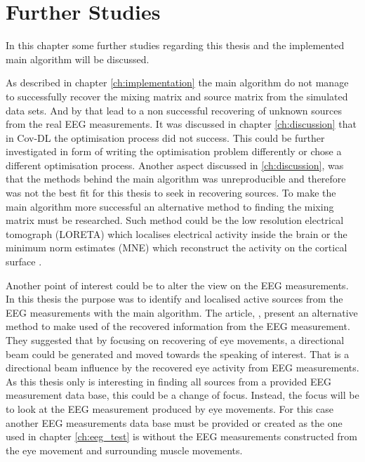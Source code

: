 \chapter{Further Studies}
In this chapter some further studies regarding this thesis and the implemented main algorithm will be discussed.

As described in chapter \ref{ch:implementation} the main algorithm do not manage to successfully recover the mixing matrix and source matrix from the simulated data sets. And by that lead to a non successful recovering of unknown sources from the real EEG measurements. 
It was discussed in chapter \ref{ch:discussion} that in Cov-DL the optimisation process did not success.
This could be further investigated in form of writing the optimisation problem differently or chose a different optimisation process. 
Another aspect discussed in \ref{ch:discussion}, was that the methods behind the main algorithm was unreproducible and therefore was not the best fit for this thesis to seek in recovering sources. 
To make the main algorithm more successful an alternative method to finding the mixing matrix must be researched. Such method could be the low resolution electrical tomograph (LORETA) which localises electrical activity inside the brain or the minimum norm estimates (MNE) which reconstruct the activity on the cortical surface \cite{??}.

Another point of interest could be to alter the view on the EEG measurements. In this thesis the purpose was to identify and localised active sources from the EEG measurements with the main algorithm. 
The article, \cite{??}, present an alternative method to make used of the recovered information from the EEG measurement. They suggested that by focusing on recovering of eye movements, a directional beam could be generated and moved towards the speaking of interest. That is a directional beam influence by the recovered eye activity from EEG measurements.
As this thesis only is interesting in finding all sources from a provided EEG measurement data base, this could be a change of focus. Instead, the focus will be to look at the EEG measurement produced by eye movements. For this case another EEG measurements data base must be provided or created as the one used in chapter \ref{ch:eeg_test} is without the EEG measurements constructed from the eye movement and surrounding muscle movements.


